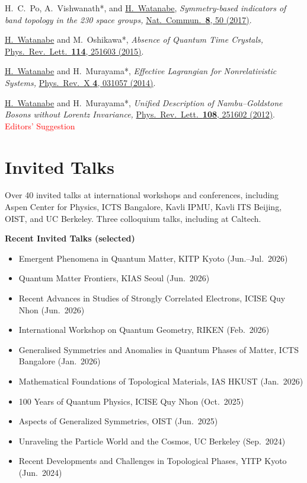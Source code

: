 \documentclass[letterpaper,11pt]{article}
\begin{document}
\begin{enumerate}[noitemsep, topsep=3pt, leftmargin=2em, label={[\arabic*]}]
\item H.~C.~Po, A.~Vishwanath*, and \underline{H.~Watanabe},
\emph{Symmetry-based indicators of band topology in the 230 space groups,}
\href{https://doi.org/10.1038/s41467-017-00133-2}{Nat.\ Commun.\ {\bf 8}, 50 (2017)}.

\item \underline{H.~Watanabe} and M.~Oshikawa*,
\emph{Absence of Quantum Time Crystals,}
\href{https://doi.org/10.1103/PhysRevLett.114.251603}{Phys.\ Rev.\ Lett.\ {\bf 114}, 251603 (2015)}.

\item \underline{H.~Watanabe} and H.~Murayama*,
\emph{Effective Lagrangian for Nonrelativistic Systems,}
\href{https://doi.org/10.1103/PhysRevX.4.031057}{Phys.\ Rev.\ X {\bf 4}, 031057 (2014)}.

\item \underline{H.~Watanabe} and H.~Murayama*,
\emph{Unified Description of Nambu--Goldstone Bosons without Lorentz Invariance,}
\href{https://doi.org/10.1103/PhysRevLett.108.251602}{Phys.\ Rev.\ Lett.\ {\bf 108}, 251602 (2012)}. {\small \textcolor{red}{Editors' Suggestion}}

\end{enumerate}

\section*{Invited Talks}
Over 40 invited talks at international workshops and conferences, including Aspen Center for Physics, ICTS Bangalore, Kavli IPMU, Kavli ITS Beijing, OIST, and UC Berkeley.  Three colloquium talks, including at Caltech.

\medskip
\noindent\textbf{Recent Invited Talks (selected)}
\begin{itemize}[noitemsep, topsep=3pt]
\item Emergent Phenomena in Quantum Matter, KITP Kyoto (Jun.--Jul.\ 2026)
\item Quantum Matter Frontiers, KIAS Seoul (Jun.\ 2026)
\item Recent Advances in Studies of Strongly Correlated Electrons, ICISE Quy Nhon (Jun.\ 2026)
\item International Workshop on Quantum Geometry, RIKEN (Feb.\ 2026)
\item Generalised Symmetries and Anomalies in Quantum Phases of Matter, ICTS Bangalore (Jan.\ 2026)
\item Mathematical Foundations of Topological Materials, IAS HKUST (Jan.\ 2026)
\item 100 Years of Quantum Physics, ICISE Quy Nhon (Oct.\ 2025)
\item Aspects of Generalized Symmetries, OIST (Jun.\ 2025)
\item Unraveling the Particle World and the Cosmos, UC Berkeley (Sep.\ 2024)
\item Recent Developments and Challenges in Topological Phases, YITP Kyoto (Jun.\ 2024)
\end{itemize}
\end{document}
